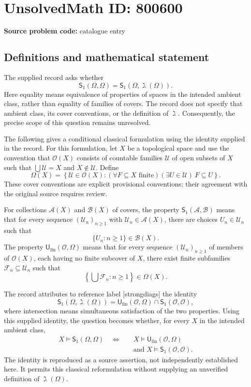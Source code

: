\documentclass[11pt]{article}
\begin{document}
\section*{UnsolvedMath ID: 800600}
\textbf{Source problem code:} catalogue entry
\subsection{Definitions and mathematical statement}
The supplied record asks whether
\[
\mathsf{S}_1(\Omega,\Omega)=\mathsf{S}_1(\Omega,\gimel(\Omega)).
\]
Here equality means equivalence of properties of spaces in the intended ambient class, rather than equality of families of covers. The record does not specify that ambient class, its cover conventions, or the definition of \(\gimel\). Consequently, the precise scope of this question remains unresolved.

The following gives a conditional classical formulation using the identity supplied in the record. For this formulation, let \(X\) be a topological space and use the convention that \(\mathcal O(X)\) consists of countable families \(\mathcal U\) of open subsets of \(X\) such that \(\bigcup\mathcal U=X\) and \(X\notin\mathcal U\). Define
\[
\Omega(X)=\left\{\mathcal U\in\mathcal O(X): (\forall F\subseteq X\text{ finite})(\exists U\in\mathcal U)\ F\subseteq U\right\}.
\]
These cover conventions are explicit provisional conventions; their agreement with the original source requires review.

For collections \(\mathcal A(X)\) and \(\mathcal B(X)\) of covers, the property \(\mathsf S_1(\mathcal A,\mathcal B)\) means that for every sequence \((\mathcal U_n)_{n\geq 1}\) with \(\mathcal U_n\in\mathcal A(X)\), there are choices \(U_n\in\mathcal U_n\) such that
\[
\{U_n:n\geq 1\}\in\mathcal B(X).
\]
The property \(\mathsf U_{\mathrm{fin}}(\mathcal O,\Omega)\) means that for every sequence \((\mathcal U_n)_{n\geq 1}\) of members of \(\mathcal O(X)\), each having no finite subcover of \(X\), there exist finite subfamilies \(\mathcal F_n\subseteq\mathcal U_n\) such that
\[
\left\{\bigcup\mathcal F_n:n\geq 1\right\}\in\Omega(X).
\]

The record attributes to reference label [strongdiags] the identity
\[
\mathsf S_1(\Omega,\gimel(\Omega))
=
\mathsf U_{\mathrm{fin}}(\mathcal O,\Omega)\cap\mathsf S_1(\mathcal O,\mathcal O),
\]
where intersection means simultaneous satisfaction of the two properties. Using this supplied identity, the question becomes whether, for every \(X\) in the intended ambient class,
\[
\begin{aligned}
X\models\mathsf S_1(\Omega,\Omega)
\quad\Longleftrightarrow\quad
&X\models\mathsf U_{\mathrm{fin}}(\mathcal O,\Omega)\\
&\text{and }X\models\mathsf S_1(\mathcal O,\mathcal O).
\end{aligned}
\]
The identity is reproduced as a source assertion, not independently established here. It permits this classical reformulation without supplying an unverified definition of \(\gimel(\Omega)\).
\end{document}
